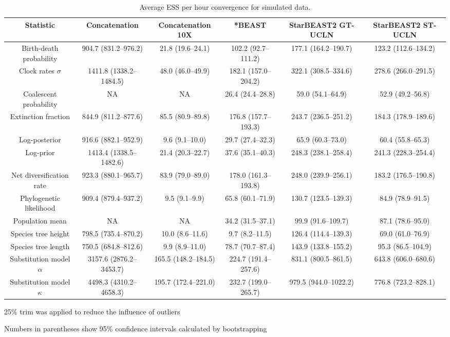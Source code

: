 \documentclass[12pt]{article}
\begin{document}
\begin{landscape}

\begin{table}[htb!]
\centering
\caption{Average ESS per hour convergence for simulated data.}
\label{tab:simulatedPerHour}
\begin{threeparttable}
\begin{adjustbox}{center}
\renewcommand{\arraystretch}{1.2}
\footnotesize
\begin{tabular}{|c|c|c|c|c|c|}
\multicolumn{1}{c}{Statistic} & \multicolumn{1}{c}{Concatenation} & \multicolumn{1}{c}{Concatenation 10X} & \multicolumn{1}{c}{*BEAST} & \multicolumn{1}{c}{StarBEAST2 GT-UCLN} & \multicolumn{1}{c}{StarBEAST2 ST-UCLN}\tabularnewline
\hline
Birth-death probability & 904.7 (831.2--976.2) & 21.8 (19.6--24.1) & 102.2 (92.7--111.2) & 177.1 (164.2--190.7) & 123.2 (112.6--134.2)\tabularnewline
\hline
Clock rates $\sigma$ & 1411.8 (1338.2--1484.5) & 48.0 (46.0--49.9) & 182.1 (157.0--204.2) & 322.1 (308.5--334.6) & 278.6 (266.0--291.5)\tabularnewline
\hline
Coalescent probability & NA & NA & 26.4 (24.4--28.8) & 59.0 (54.1--64.9) & 52.9 (49.2--56.8)\tabularnewline
\hline
Extinction fraction & 844.9 (811.2--877.6) & 85.5 (80.9--89.8) & 176.8 (157.7--193.3) & 243.7 (236.5--251.2) & 184.3 (178.9--189.6)\tabularnewline
\hline
Log-posterior & 916.6 (882.1--952.9) & 9.6 (9.1--10.0) & 29.7 (27.4--32.3) & 65.9 (60.3--73.0) & 60.4 (55.8--65.3)\tabularnewline
\hline
Log-prior & 1413.4 (1338.5--1482.6) & 21.4 (20.3--22.7) & 37.6 (35.1--40.3) & 248.3 (238.1--258.4) & 241.3 (228.3--254.4)\tabularnewline
\hline
Net diversification rate & 923.3 (880.1--965.7) & 83.9 (79.0--89.0) & 178.0 (161.3--193.8) & 248.0 (239.9--256.1) & 183.2 (176.5--190.8)\tabularnewline
\hline
Phylogenetic likelihood & 909.4 (879.4--937.2) & 9.5 (9.1--9.9) & 65.8 (60.1--71.9) & 130.7 (123.5--139.3) & 84.9 (78.9--91.5)\tabularnewline
\hline
Population mean & NA & NA & 34.2 (31.5--37.1) & 99.9 (91.6--109.7) & 87.1 (78.6--95.0)\tabularnewline
\hline
Species tree height & 798.5 (735.4--870.2) & 10.0 (8.6--11.6) & 9.7 (8.2--11.5) & 126.4 (114.4--139.3) & 69.0 (61.0--76.9)\tabularnewline
\hline
Species tree length & 750.5 (684.8--812.6) & 9.9 (8.9--11.0) & 78.7 (70.7--87.4) & 143.9 (133.8--155.2) & 95.3 (86.5--104.9)\tabularnewline
\hline
Substitution model $\alpha$ & 3157.6 (2876.2--3453.7) & 165.5 (148.2--184.5) & 224.7 (191.4--257.6) & 831.1 (800.5--861.5) & 643.8 (606.0--680.6)\tabularnewline
\hline
Substitution model $\kappa$ & 4498.3 (4310.2--4658.3) & 195.7 (172.4--221.0) & 232.7 (199.0--265.7) & 979.5 (944.0--1022.2) & 776.8 (723.2--828.1)\tabularnewline
\hline
\end{tabular}
\end{adjustbox}
\begin{tablenotes}
\footnotesize
\item 25\% trim was applied to reduce the influence of outliers
\item Numbers in parentheses show 95\% confidence intervals calculated by bootstrapping
\end{tablenotes}
\end{threeparttable}
\end{table}


\end{landscape}
\end{document}
